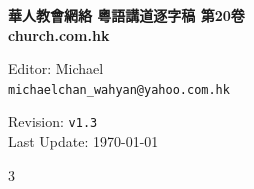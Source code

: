 \documentclass{book}
\author{
  Editor, Michael Chan\\
  \texttt{michaelchan\_wahyan@yahoo.com.hk}
}
\begin{document}
\clearpage
\newcommand\nbvspace[1][3]{\vspace*{\stretch{#1}}}
\newcommand\nbstretchyspace{\spaceskip0.5em plus 0.25em minus 0.25em}
\newcommand{\nbtitlestretch}{\spaceskip0.6em}
\pagestyle{empty}
\begin{center}
\bfseries
\nbvspace[1]
\Huge
{%
\Large
\textbf{華人教會網絡 粵語講道逐字稿 第20卷 \\
       church.com.hk
       }}

\nbvspace[1]

{\large
Editor: Michael\\
\texttt{michaelchan\_wahyan@yahoo.com.hk}
}

\nbvspace[1]

{\large
Revision: \texttt{v1.3}\\
Last Update: \today
}


\vfill
\begin{tikzpicture}
\end{tikzpicture}
\vfill

\end{center}

\newpage

\setcounter{tocdepth}{0}
\dominitoc
\begin{multicols}{3}
\tableofcontents
\end{multicols}

\large

\end{document}
